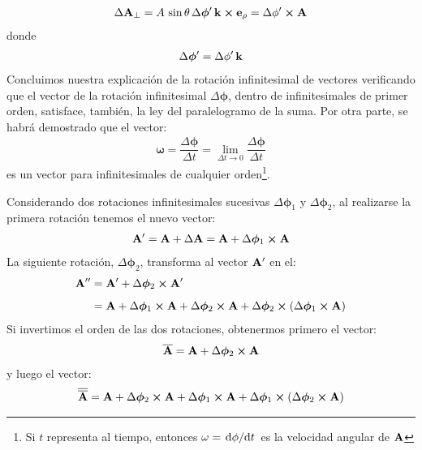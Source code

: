 \begin{align}
    \Delta \vb{A}_{\perp} = A \, \sin \theta \, \Delta \bm{\phi}^{\prime} \, \vb{k} \cp \vb{e}_{\rho} = \Delta \phi^{\prime} \cp \vb{A}
    \label{eq:ecuacion_01_72}
\end{align}
donde
\begin{align*}
    \Delta \bm{\phi}^{\prime} = \Delta \phi^{\prime} \, \vb{k}
\end{align*}
Concluimos nuestra explicación de la rotación infinitesimal de vectores verificando que el vector de la rotación infinitesimal $\Delta \bm{\phi}$, dentro de infinitesimales de primer orden, satisface, también, la ley del paralelogramo de la suma. Por otra parte, se habrá demostrado que el vector:
\begin{align*}
    \bm{\omega} = \dfrac{\Delta \bm{\phi}}{\Delta t} = \lim_{\Delta t \to 0} \dfrac{\Delta \bm{\phi}}{\Delta t}
\end{align*}
es un vector para infinitesimales de cualquier orden\footnote{Si $t$ representa al tiempo, entonces $\vb{\omega} = \dv*{\vb{\phi}}{t}$ es la velocidad angular de $\vb{A}$}.
\par
Considerando dos rotaciones infinitesimales sucesivas $\Delta \bm{\phi}_{1}$ y $\Delta \bm{\phi}_{2}$, al realizarse la primera rotación tenemos el nuevo vector:
\begin{align}
    \vb{A}^{\prime} = \vb{A} + \Delta \vb{A} = \vb{A} + \Delta \bm{\phi}_{1} \cp \vb{A}
    \label{eq:ecuacion_01_73}
\end{align}
La siguiente rotación, $\Delta \bm{\phi}_{2}$, transforma al vector $\vb{A}^{\prime}$ en el:
\begin{align}
\begin{aligned}[b]
\vb{A}^{\prime \prime} &= \vb{A}^{\prime} + \Delta \bm{\phi}_{2} \cp \vb{A}^{\prime} \\[0.5em]
&= \vb{A} + \Delta \bm{\phi}_{1} \cp \vb{A} + \Delta \bm{\phi}_{2} \cp \vb{A} + \Delta \bm{\phi}_{2} \cp \left( \Delta \bm{\phi}_{1} \cp \vb{A} \right) 
\end{aligned}
\label{eq:ecuacion_01_74}
\end{align}
Si invertimos el orden de las dos rotaciones, obtenermos primero el vector:
\begin{align}
    \overline{\vb{A}} = \vb{A} + \Delta \bm{\phi}_{2} \cp \vb{A}
    \label{eq:ecuacion_01_75}
\end{align}
y luego el vector:
\begin{align}
    \overline{\overline{\vb{A}}} = \vb{A} + \Delta \bm{\phi}_{2} \cp \vb{A} + \Delta \bm{\phi}_{1} \cp \vb{A} + \Delta \bm{\phi}_{1} \cp \left( \Delta \bm{\phi}_{2} \cp \vb{A} \right)
    \label{eq:ecuacion_01_76}
\end{align}
